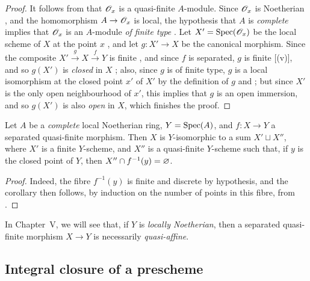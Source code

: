 \begin{proof}
It follows from  that $\mathscr{O}_x$ is a quasi-finite $A$-module.
Since $\mathscr{O}_x$ is Noetherian , and the homomorphism $A\to\sh{O}_x$ is local, the hypothesis that $A$ is \emph{complete} implies that $\mathscr{O}_x$ is an $A$-module \emph{of finite type} .
Let $X'=\operatorname{Spec}(\mathscr{O}_x)$ be the local scheme of $X$ at the point $x$ , and let $g:X'\to X$ be the canonical morphism.
Since the composite $X'\xrightarrow{g}X\xrightarrow{f}Y$ is finite , and since $f$ is separated, $g$ is finite [(v)], and so $g(X')$ is \emph{closed} in $X$ ;
also, since $g$ is of finite type, $g$ is a local isomorphism at the closed point $x'$ of $X'$ by the definition of $g$ and ;
but since $X'$ is the only open neighbourhood of $x'$, this implies that $g$ is an open immersion, and so $g(X')$ is also \emph{open} in $X$, which finishes the proof.
\end{proof}

\begin{corollary}[6.2.6]
\label{II.6.2.6}
Let $A$ be a \emph{complete} local Noetherian ring, $Y=\operatorname{Spec}(A)$, and $f:X\to Y$ a separated quasi-finite morphism.
Then $X$ is $Y$-isomorphic to a sum $X'\sqcup X''$, where $X'$ is a finite $Y$-scheme, and $X''$ is a quasi-finite $Y$-scheme such that, if $y$ is the closed point of $Y$, then $X''\cap f^{-1}(y)=\varnothing$.
\end{corollary}

\begin{proof}
Indeed, the fibre $f^{-1}(y)$ is finite and discrete by hypothesis, and the corollary then follows, by induction on the number of points in this fibre, from .
\end{proof}

\begin{remark}[6.2.7]
\label{II.6.2.7}
In Chapter~V, we will see that, if $Y$ is \emph{locally Noetherian}, then a separated quasi-finite morphism $X\to Y$ is necessarily \emph{quasi-affine}.
\end{remark}


\subsection{Integral closure of a prescheme}
\label{subsection:II.6.3}

